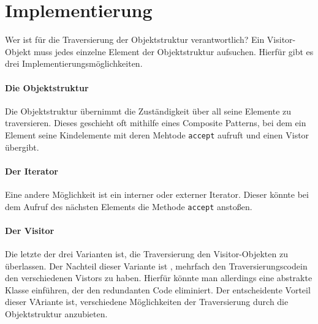 \section{Implementierung}

Wer ist für die Traversierung der  Objektstruktur verantwortlich? Ein Visitor-Objekt muss jedes einzelne Element der Objektstruktur aufsuchen. Hierfür gibt es drei Implementierungsmöglichkeiten. 
\paragraph{Die Objektstruktur} Die Objektstruktur übernimmt die Zuständigkeit über all seine Elemente zu traversieren. Dieses geschieht oft mithilfe eines Composite Patterns, bei dem ein Element seine Kindelemente mit deren Mehtode \texttt{accept} aufruft und einen Vistor übergibt.
\paragraph{Der Iterator} Eine andere Möglichkeit ist ein interner oder externer Iterator. Dieser könnte bei dem Aufruf des nächsten Elements die Methode \texttt{accept} anstoßen.
\paragraph{Der Visitor} Die letzte der drei Varianten ist, die Traversierung den Visitor-Objekten zu überlassen. Der Nachteil dieser Variante ist , mehrfach den Traversierungscodein den verschiedenen Vistors zu haben. Hierfür könnte man allerdings eine abstrakte Klasse einführen, der den redundanten Code eliminiert. Der entscheidente Vorteil dieser VAriante ist, verschiedene Möglichkeiten der Traversierung durch die Objektstruktur anzubieten.



